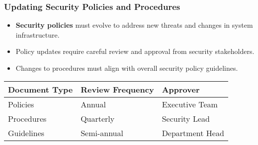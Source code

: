 \documentclass{beamer}
\begin{document}
                    \begin{frame}
                    \frametitle{Updating Security Policies and Procedures}
                    \begin{itemize}
                        \item \textbf{Security policies} must evolve to address new threats and changes in system infrastructure.
                        
                        \item Policy updates require careful review and approval from security stakeholders.
                        
                        \item Changes to procedures must align with overall security policy guidelines.
                    \end{itemize}
                    \begin{table}
                    \begin{tabular}{lll}
                    \toprule
                    \textbf{Document Type} & \textbf{Review Frequency} & \textbf{Approver} \\
                    \midrule
                    Policies & Annual & Executive Team \\
                    Procedures & Quarterly & Security Lead \\
                    Guidelines & Semi-annual & Department Head \\
                    \bottomrule
                    \end{tabular}
                    \end{table}
                    \end{frame}
                    
\end{document}

